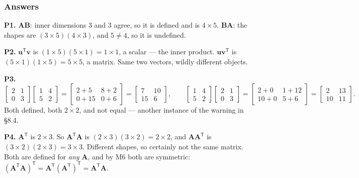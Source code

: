 \documentclass[11pt]{article}
\theoremstyle{plain}
\theoremstyle{definition}
\theoremstyle{remark}
\newcommand{\vc}[1]{\mathbf{#1}}        %
\newcommand{\mt}[1]{\mathbf{#1}}        %
\newcommand{\T}{^{\mathsf{T}}}          %
\begin{document}
\subsubsection*{Answers}

\noindent\textbf{P1.} $\mt{A}\mt{B}$: inner dimensions $3$ and $3$ agree, so it
is defined and is $4\times5$. $\mt{B}\mt{A}$: the shapes are
$(3\times5)(4\times3)$, and $5\neq4$, so it is undefined.

\smallskip
\noindent\textbf{P2.} $\vc{u}\T\vc{v}$ is $(1\times5)(5\times1)=1\times1$, a
scalar --- the inner product. $\vc{u}\vc{v}\T$ is
$(5\times1)(1\times5)=5\times5$, a matrix. Same two vectors, wildly different
objects.

\smallskip
\noindent\textbf{P3.}
\[
  \begin{bmatrix}2&1\\0&3\end{bmatrix}\begin{bmatrix}1&4\\5&2\end{bmatrix}
   =\begin{bmatrix}2{+}5&8{+}2\\0{+}15&0{+}6\end{bmatrix}
   =\begin{bmatrix}7&10\\15&6\end{bmatrix},
  \qquad
  \begin{bmatrix}1&4\\5&2\end{bmatrix}\begin{bmatrix}2&1\\0&3\end{bmatrix}
   =\begin{bmatrix}2{+}0&1{+}12\\10{+}0&5{+}6\end{bmatrix}
   =\begin{bmatrix}2&13\\10&11\end{bmatrix}.
\]
Both defined, both $2\times2$, and not equal --- another instance of the warning
in \S8.4.

\smallskip
\noindent\textbf{P4.} $\mt{A}\T$ is $2\times3$. So $\mt{A}\T\mt{A}$ is
$(2\times3)(3\times2)=2\times2$, and $\mt{A}\mt{A}\T$ is
$(3\times2)(2\times3)=3\times3$. Different shapes, so certainly not the same
matrix. Both are defined for \emph{any} $\mt{A}$, and by M6 both are symmetric:
$(\mt{A}\T\mt{A})\T=\mt{A}\T(\mt{A}\T)\T=\mt{A}\T\mt{A}$.
\end{document}

